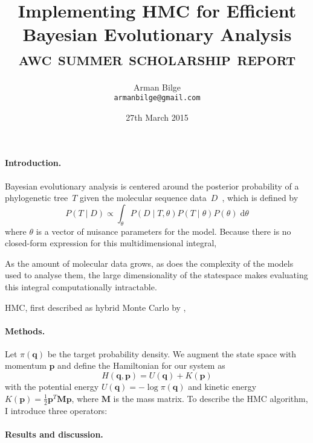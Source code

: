 \documentclass{article}
\title{Implementing \acl{HMC} for Efficient Bayesian Evolutionary Analysis \\
           \Large\textsc{awc summer scholarship report}}
\author{Arman Bilge \\ \texttt{armanbilge@gmail.com}}
\date{27th March 2015}
\newcommand{\dd}{\; \mathrm{d}}
\renewcommand{\vec}[1]{\ensuremath{\mathbf{#1}}}
\newcommand{\mat}[1]{\ensuremath{\mathbf{#1}}}
\begin{document}
    \maketitle

    \paragraph{Introduction.}



    Bayesian evolutionary analysis is centered around the posterior probability
        of a phylogenetic tree~$T$ given the molecular sequence
        data~$D$~\cite{Bou+14}, which is defined by
        \begin{equation}
            P\left(T \mid D\right)
                \propto \int_\theta P\left(D \mid T,\theta\right)
                P\left(T \mid \theta\right) P\left(\theta\right) \dd\theta
        \end{equation}
        where $\theta$ is a vector of nuisance parameters for the model.
    Because there is no closed-form expression for this multidimensional
        integral,


    As the amount of molecular data grows, as does the complexity of the models
        used to analyse them, the large dimensionality of the statespace makes
        evaluating this integral computationally intractable.

    \ac{HMC}, first described as hybrid Monte Carlo by \textcite{Dua+87},

    \paragraph{Methods.}

    Let $\pi\left(\vec{q}\right)$ be the target probability density.
    We augment the state space with momentum $\vec{p}$ and define the
        Hamiltonian for our system as
        \begin{equation}
            H\left(\vec{q},\vec{p}\right)
            = U\left(\vec{q}\right) + K\left(\vec{p}\right)
        \end{equation}
        with the potential energy
        $U\left(\vec{q}\right) = -\log{\pi\left(\vec{q}\right)}$ and kinetic
        energy $K\left(\vec{p}\right) = \frac{1}{2} \vec{p}^T \mat{M} \vec{p}$,
        where $\mat{M}$ is the mass matrix.
    To describe the \ac{HMC} algorithm, I introduce three operators:

    \paragraph{Results and discussion.}

    \printbibliography
\end{document}
